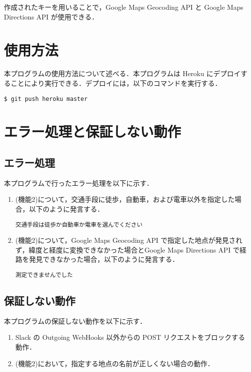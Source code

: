 \documentclass[12pt]{jsarticle}
\begin{document}
  作成されたキーを用いることで，Google Maps Geocoding API と Google Maps Directions API が使用できる．
 
\section{使用方法}
本プログラムの使用方法について述べる．本プログラムは Heroku にデプロイすることにより実行できる．デプロイには，以下のコマンドを実行する．

\verb|$ git push heroku master|

\section{エラー処理と保証しない動作}
\subsection{エラー処理}
本プログラムで行ったエラー処理を以下に示す．

\begin{enumerate}
  \item (機能2)について，交通手段に徒歩，自動車，および電車以外を指定した場合，以下のように発言する．
    \begin{verbatim}
交通手段は徒歩か自動車か電車を選んでください
    \end{verbatim}
  \item (機能2)について，Google Maps Geocoding API で指定した地点が発見されず，緯度と経度に変換できなかった場合とGoogle Maps Directions API で経路を発見できなかった場合，以下のように発言する．

    \begin{verbatim}
測定できませんでした
    \end{verbatim}
\end{enumerate}

\subsection{保証しない動作}
本プログラムの保証しない動作を以下に示す．

\begin{enumerate}
  \item Slack の Outgoing WebHooks 以外からの POST リクエストをブロックする動作．
  \item (機能2)において，指定する地点の名前が正しくない場合の動作．
\end{enumerate}




\end{document}
